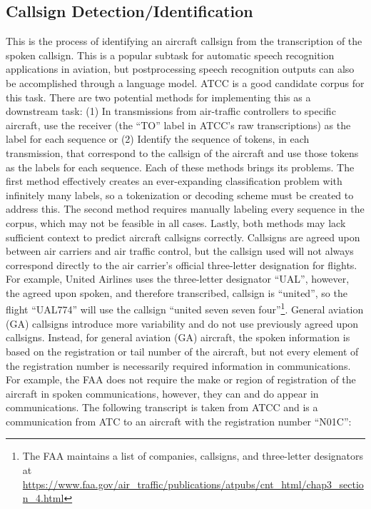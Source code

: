 \documentclass[12pt]{article}
\begin{document}
\subsection{Callsign Detection/Identification}
This is the process of identifying an aircraft callsign from the transcription of the spoken callsign. This is a popular subtask for automatic speech
recognition applications in aviation, but postprocessing speech recognition outputs can also be accomplished through a language model. ATCC is a good
candidate corpus for this task. There are two potential methods for implementing this as a downstream task: (1) In transmissions from air-traffic
controllers to specific aircraft, use the receiver (the ``TO'' label in ATCC's raw transcriptions) as the label for each sequence or (2) Identify the
sequence of tokens, in each transmission, that correspond to the callsign of the aircraft and use those tokens as the labels for each sequence. Each
of these methods brings its problems. The first method effectively creates an ever-expanding classification problem with infinitely many labels, so a
tokenization or decoding scheme must be created to address this. The second method requires manually labeling every sequence in the corpus, which may
not be feasible in all cases. Lastly, both methods may lack sufficient context to predict aircraft callsigns correctly. Callsigns are agreed upon
between air carriers and air traffic control, but the callsign used will not always correspond directly to the air carrier's official three-letter
designation for flights. For example, United Airlines uses the three-letter designator ``UAL'', however, the agreed upon spoken, and therefore
transcribed, callsign is ``united'', so the flight ``UAL774'' will use the callsign ``united seven seven four''\footnote{The FAA maintains a list of
    companies, callsigns, and three-letter designators at \url{https://www.faa.gov/air_traffic/publications/atpubs/cnt_html/chap3_section_4.html}}.
General aviation (GA) callsigns introduce more variability and do not use previously agreed upon callsigns. Instead, for general aviation (GA)
aircraft, the spoken information is based on the registration or tail number of the aircraft, but not every element of the registration number is
necessarily required information in communications. For example, the FAA does not require the make or region of registration of the aircraft in spoken
communications, however, they can and do appear in communications. The following transcript is taken from ATCC and is a communication from ATC to an
aircraft with the registration number ``N01C'':
\end{document}
